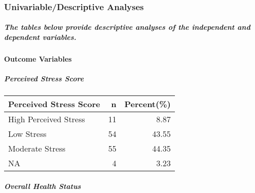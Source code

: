 \documentclass[]{article}
\newenvironment{Shaded}{\begin{snugshade}}{\end{snugshade}}
\newcommand{\DataTypeTok}[1]{\textcolor[rgb]{0.13,0.29,0.53}{#1}}
\newcommand{\DecValTok}[1]{\textcolor[rgb]{0.00,0.00,0.81}{#1}}
\newcommand{\KeywordTok}[1]{\textcolor[rgb]{0.13,0.29,0.53}{\textbf{#1}}}
\newcommand{\NormalTok}[1]{#1}
\newcommand{\OperatorTok}[1]{\textcolor[rgb]{0.81,0.36,0.00}{\textbf{#1}}}
\newcommand{\StringTok}[1]{\textcolor[rgb]{0.31,0.60,0.02}{#1}}
\let\oldparagraph\paragraph
\renewcommand{\paragraph}[1]{\oldparagraph{#1}\mbox{}}
\let\oldsubparagraph\subparagraph
\renewcommand{\subparagraph}[1]{\oldsubparagraph{#1}\mbox{}}
\begin{document}
\hypertarget{univariabledescriptive-analyses}{%
\subsubsection{Univariable/Descriptive
Analyses}\label{univariabledescriptive-analyses}}

\hypertarget{the-tables-below-provide-descriptive-analyses-of-the-independent-and-dependent-variables.}{%
\subparagraph{The tables below provide descriptive analyses of the
independent and dependent
variables.}\label{the-tables-below-provide-descriptive-analyses-of-the-independent-and-dependent-variables.}}

\hypertarget{outcome-variables}{%
\paragraph{Outcome Variables}\label{outcome-variables}}

\hypertarget{perceived-stress-score}{%
\subparagraph{Perceived Stress Score}\label{perceived-stress-score}}

\begin{Shaded}
\end{Shaded}

\begin{longtable}[]{@{}lrr@{}}
\toprule
Perceived Stress Score & n & Percent(\%)\tabularnewline
\midrule
\endhead
High Perceived Stress & 11 & 8.87\tabularnewline
Low Stress & 54 & 43.55\tabularnewline
Moderate Stress & 55 & 44.35\tabularnewline
NA & 4 & 3.23\tabularnewline
\bottomrule
\end{longtable}

\hypertarget{overall-health-status}{%
\subparagraph{Overall Health Status}\label{overall-health-status}}
\end{document}
